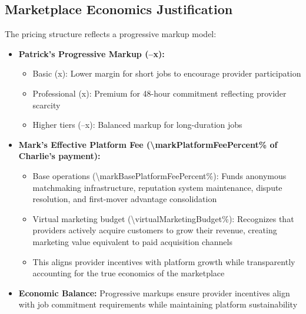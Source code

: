 \subsection{Marketplace Economics Justification}
The pricing structure reflects a progressive markup model:
\begin{itemize}
  \item \textbf{Patrick's Progressive Markup (\numfpeval{\patrickMarkupBasic}--\numfpeval{\patrickMarkupPlatinum}x):} 
  \begin{itemize}
    \item Basic (\numfpeval{\patrickMarkupBasic}x): Lower margin for short jobs to encourage provider participation
    \item Professional (\numfpeval{\patrickMarkupProfessional}x): Premium for 48-hour commitment reflecting provider scarcity
    \item Higher tiers (\numfpeval{\patrickMarkupGolden}--\numfpeval{\patrickMarkupPlatinum}x): Balanced markup for long-duration jobs
  \end{itemize}
  \item \textbf{Mark's Effective Platform Fee (\num{\markPlatformFeePercent}\% of Charlie's payment):} 
  \begin{itemize}
    \item Base operations (\num{\markBasePlatformFeePercent}\%): Funds anonymous matchmaking infrastructure, reputation system maintenance, dispute resolution, and first-mover advantage consolidation
    \item Virtual marketing budget (\num{\virtualMarketingBudget}\%): Recognizes that providers actively acquire customers to grow their revenue, creating marketing value equivalent to paid acquisition channels
    \item This aligns provider incentives with platform growth while transparently accounting for the true economics of the marketplace\cite{eisenmann2006,andreessen2020}
  \end{itemize}
  \item \textbf{Economic Balance:} Progressive markups ensure provider incentives align with job commitment requirements while maintaining platform sustainability
\end{itemize}

